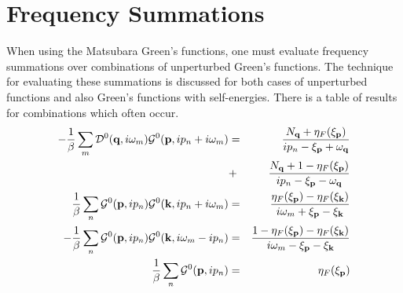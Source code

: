 \section{Frequency Summations}\label{s3.5}
When using the Matsubara Green's functions, one must evaluate frequency summations over combinations of unperturbed Green's functions.
The technique for evaluating these summations is discussed for both cases of unperturbed functions and also Green's functions with self-energies.
There is a table of results for combinations which often occur.
\begin{eqnarray}
  -\frac{1}{\beta} \sum_m \mathcal{D}^0(\mathbf{q},i\omega_m)\mathcal{G}^0(\mathbf{p},ip_n+i\omega_m) &=& \frac{N_{\mathbf{q}} + \eta_F(\xi_{\mathbf{p}})}{ip_n-\xi_{\mathbf{p}}+\omega_{\mathbf{q}}} \nonumber \\
  &+& \frac{N_{\mathbf{q}} + 1 - \eta_F(\xi_{\mathbf{p}})}{ip_n -\xi_{\mathbf{p}}-\omega_{\mathbf{q}}} \label{3.216} \\
  \frac{1}{\beta} \sum_n \mathcal{G}^0(\mathbf{p},ip_n) \mathcal{G}^0(\mathbf{k},ip_n+i\omega_m) &=& \frac{\eta_F(\xi_{\mathbf{p}})-\eta_F(\xi_{\mathbf{k}})}{i\omega_m + \xi_{\mathbf{p}} -\xi_{\mathbf{k}}} \label{3.217} \\
  -\frac{1}{\beta} \sum_n \mathcal{G}^0(\mathbf{p},ip_n) \mathcal{G}^0(\mathbf{k},i\omega_m-ip_n) &=& \frac{1-\eta_F(\xi_{\mathbf{p}}) - \eta_F(\xi_{\mathbf{k}})}{i\omega_m -\xi_{\mathbf{p}} -\xi_{\mathbf{k}}} \label{3.218}\\
  \frac{1}{\beta} \sum_n \mathcal{G}^0(\mathbf{p},ip_n) &=& \eta_F(\xi_{\mathbf{p}})\label{3.219}
\end{eqnarray}

